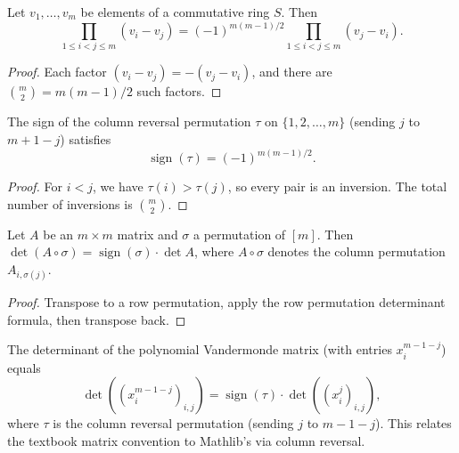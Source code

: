 \begin{lemma}
\label{lem.det.vander.prod-Ioi-neg-sub}
\leanhelper
\leanok
Let $v_1, \ldots, v_m$ be elements of a commutative ring $S$. Then
\[
  \prod_{1 \leq i < j \leq m} (v_i - v_j)
  = (-1)^{m(m-1)/2} \prod_{1 \leq i < j \leq m} (v_j - v_i).
\]
\end{lemma}

\begin{proof}
Each factor $(v_i - v_j) = -(v_j - v_i)$, and there are $\binom{m}{2} = m(m-1)/2$
such factors.
\end{proof}

\begin{lemma}
\label{lem.det.vander.sign-Fin-revPerm}
\leanhelper
\leanok
The sign of the column reversal permutation $\tau$ on $\{1, 2, \ldots, m\}$
(sending $j$ to $m + 1 - j$) satisfies
\[
  \operatorname{sign}(\tau) = (-1)^{m(m-1)/2}.
\]
\end{lemma}

\begin{proof}
For $i < j$, we have $\tau(i) > \tau(j)$,
so every pair is an inversion. The total number of inversions is $\binom{m}{2}$.
\end{proof}

\begin{lemma}
\label{lem.det.vander.col-perm}
\leanhelper
\leanok
Let $A$ be an $m \times m$ matrix and $\sigma$ a permutation of $[m]$.
Then $\det(A \circ \sigma) = \operatorname{sign}(\sigma) \cdot \det A$,
where $A \circ \sigma$ denotes the column permutation $A_{i,\sigma(j)}$.
\end{lemma}

\begin{proof}
\leanok
Transpose to a row permutation, apply the row permutation determinant formula,
then transpose back.
\end{proof}

\begin{lemma}
\label{lem.det.vander.det-vandermondePolyMat}
\leanhelper
\leanok
The determinant of the polynomial Vandermonde matrix (with entries $x_i^{m-1-j}$)
equals
\[
  \det\!\left(\left(x_i^{m-1-j}\right)_{i,j}\right) =
  \operatorname{sign}(\tau) \cdot
  \det\!\left(\left(x_i^{j}\right)_{i,j}\right),
\]
where $\tau$ is the column reversal permutation (sending $j$ to $m - 1 - j$).
This relates the textbook matrix convention to Mathlib's via column reversal.
\end{lemma}

